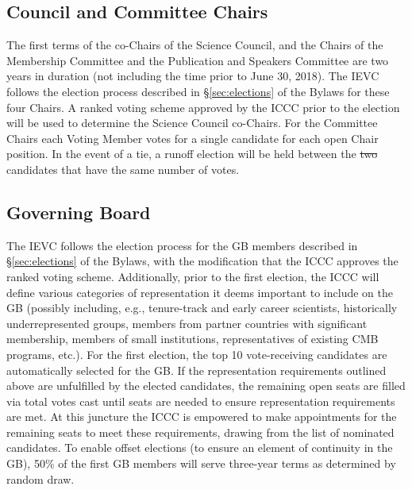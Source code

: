 \documentclass[12pt]{article}
\begin{document}
\subsection{Council and Committee Chairs}
\textcolor{\markcolor}{The first terms of the co-Chairs of the Science Council, and the Chairs of the Membership Committee and the Publication and Speakers Committee are two years in duration (not including the time prior to June 30, 2018). 
The IEVC follows the election process described in \S\ref{sec:elections} of the Bylaws for these four Chairs.
A ranked voting scheme approved by the ICCC prior to the election will be used to determine the Science Council co-Chairs.  For the Committee Chairs each Voting Member votes for a single candidate for each open Chair position. In the event of a tie, a runoff election will be held between the \sout{two} candidates that have the same number of votes. }


\subsection{Governing Board}
\textcolor{\markcolor}{The IEVC follows the election process \textcolor{\markcolor} {for the GB members} described in \S\ref{sec:elections} of the Bylaws, with the modification that the ICCC approves the ranked voting scheme.  Additionally,} prior to the first election, the ICCC will define various categories of representation it deems important to include on the GB (possibly including, e.g., tenure-track and early career scientists,  historically underrepresented groups, members from partner countries with significant membership, members of small institutions, representatives of existing CMB programs, etc.). For the first election, the top 10 vote-receiving candidates are automatically selected for the GB. If the representation requirements outlined above are unfulfilled by the elected candidates, the remaining open seats are filled via total votes cast until seats are needed to ensure representation requirements are met. At this juncture the  ICCC is empowered to make appointments for the remaining seats to meet these requirements, drawing from the list of nominated candidates. 
To enable offset elections (to ensure an element of continuity in the GB), 50\% of the first GB members will serve three-year terms as determined by random draw. 
\end{document}
